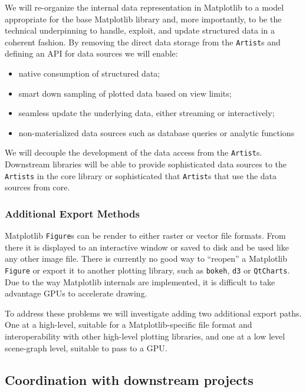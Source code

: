 \documentclass[11pt]{article}  %
\begin{document}
We will re-organize the internal data representation in Matplotlib to
a model appropriate for the base Matplotlib library and, more
importantly, to be the technical underpinning to handle, exploit, and
update structured data in a coherent fashion.
By removing the direct data storage from
the \texttt{Artist}s and defining an API for data sources we will enable:
\begin{itemize}[noitemsep]
  \item native consumption of structured data;
  \item smart down sampling of plotted data based on view limits;
  \item seamless update the underlying data, either
    streaming or interactively;
  \item non-materialized data sources such as database queries or analytic functions
\end{itemize}
We will decouple the development of the data access from the
\texttt{Artist}s.  Downstream libraries will be able to provide
sophisticated data sources to the \texttt{Artists} in the core library
or sophisticated that \texttt{Artist}s that use the data sources from
core.


\subsubsection{Additional Export Methods}

Matplotlib \texttt{Figure}s can be render to either raster or vector
file formats.  From there it is displayed to an interactive window or
saved to disk and be used like any other image file.  There is
currently no good way to ``reopen'' a Matplotlib \texttt{Figure} or
export it to another plotting library, such as \texttt{bokeh},
\texttt{d3} or \texttt{QtCharts}.  Due to the way Matplotlib
internals are implemented, it is difficult to take advantage GPUs to
accelerate drawing.

To address these problems we will investigate adding two additional
export paths.  One at a high-level, suitable for a Matplotlib-specific
file format and interoperability with other high-level plotting
libraries, and one at a low level scene-graph level, suitable to pass
to a GPU.


\subsection{Coordination with downstream projects}
\end{document}
